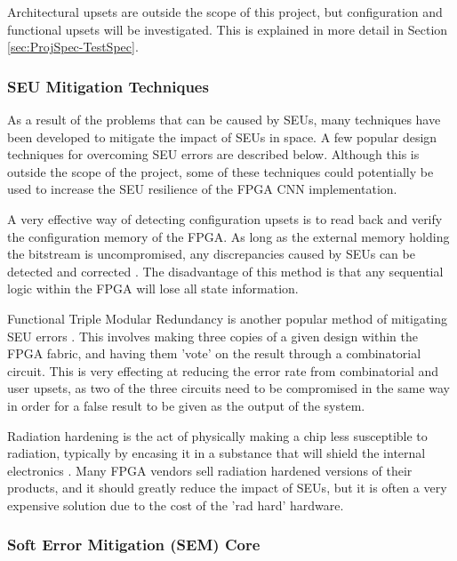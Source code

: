 \documentclass[12pt]{article}
\begin{document}
Architectural upsets are outside the scope of this project, but configuration and functional upsets will be investigated. This is explained in more detail in Section \ref{sec:ProjSpec-TestSpec}.

\subsubsection{SEU Mitigation Techniques}
\label{sec:Background-FPGAsAndSpaceApplications-Mitigation}

As a result of the problems that can be caused by SEUs, many techniques have been developed to mitigate the impact of SEUs in space. A few popular design techniques for overcoming SEU errors are described below. Although this is outside the scope of the project, some of these techniques could potentially be used to increase the SEU resilience of the FPGA CNN implementation.

A very effective way of detecting configuration upsets is to read back and verify the configuration memory of the FPGA. As long as the external memory holding the bitstream is uncompromised, any discrepancies caused by SEUs can be detected and corrected \cite{SuitabilityGaisler}. The disadvantage of this method is that any sequential logic within the FPGA will lose all state information.

Functional Triple Modular Redundancy is another popular method of mitigating SEU errors \cite{FTripleMR}. This involves making three copies of a given design within the FPGA fabric, and having them 'vote' on the result through a combinatorial circuit. This is very effecting at reducing the error rate from combinatorial and user upsets, as two of the three circuits need to be compromised in the same way in order for a false result to be given as the output of the system.

Radiation hardening is the act of physically making a chip less susceptible to radiation, typically by encasing it in a substance that will shield the internal electronics \cite{RadHardFpga}. Many FPGA vendors sell radiation hardened versions of their products, and it should greatly reduce the impact of SEUs, but it is often a very expensive solution due to the cost of the 'rad hard' hardware.

\subsubsection{Soft Error Mitigation (SEM) Core}
\label{sec:Background-FPGAsAndSpaceApplications-SEM}
\end{document}
